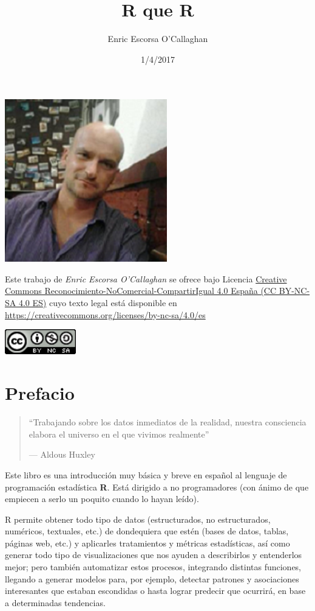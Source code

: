 \documentclass[]{book}
\title{R que R}
\author{Enric Escorsa O'Callaghan}
\date{1/4/2017}
\theoremstyle{definition}
\theoremstyle{definition}
\theoremstyle{definition}
\theoremstyle{remark}
\begin{document}
\maketitle

{
\setcounter{tocdepth}{1}
\tableofcontents
}
\includegraphics[width=2.78in]{fotoenric2}

Este trabajo de \emph{Enric Escorsa O'Callaghan} se ofrece bajo Licencia
\href{https://creativecommons.org/licenses/by-nc-sa/4.0/es/}{Creative
Commons Reconocimiento-NoComercial-CompartirIgual 4.0 España (CC
BY-NC-SA 4.0 ES)} cuyo texto legal está disponible en
\url{https://creativecommons.org/licenses/by-nc-sa/4.0/es}

\includegraphics[width=1.22in]{cc}

\hypertarget{prefacio}{%
\chapter{Prefacio}\label{prefacio}}

\begin{quote}
``Trabajando sobre los datos inmediatos de la realidad, nuestra
consciencia elabora el universo en el que vivimos realmente''

--- Aldous Huxley
\end{quote}

Este libro es una introducción muy básica y breve en español al lenguaje
de programación estadística \textbf{R}. Está dirigido a no programadores
(con ánimo de que empiecen a serlo un poquito cuando lo hayan leído).

R permite obtener todo tipo de datos (estructurados, no estructurados,
numéricos, textuales, etc.) de dondequiera que estén (bases de datos,
tablas, páginas web, etc.) y aplicarles tratamientos y métricas
estadísticas, así como generar todo tipo de visualizaciones que nos
ayuden a describirlos y entenderlos mejor; pero también automatizar
estos procesos, integrando distintas funciones, llegando a generar
modelos para, por ejemplo, detectar patrones y asociaciones interesantes
que estaban escondidas o hasta lograr predecir que ocurrirá, en base a
determinadas tendencias.
\end{document}
